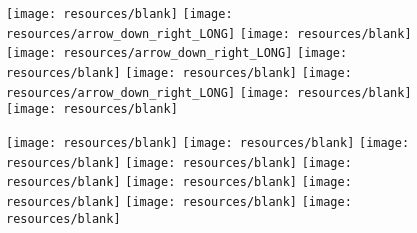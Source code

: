\documentclass[11pt]{article}
\begin{document}
\begin{figure}[htbp]
\begin{minipage}[t]{0.125\textwidth}
  \end{minipage}%
  \begin{minipage}[t]{0.250\textwidth} %
    \centering
    \texttt{[image: resources/blank]}
    \texttt{[image: resources/arrow\_down\_right\_LONG]}
    \texttt{[image: resources/blank]}
    \texttt{[image: resources/arrow\_down\_right\_LONG]}
    \texttt{[image: resources/blank]}
    \texttt{[image: resources/blank]}
    \texttt{[image: resources/arrow\_down\_right\_LONG]}
    \texttt{[image: resources/blank]}
    \texttt{[image: resources/blank]}
  \end{minipage}%
  \begin{minipage}[t]{0.125\textwidth} %
%
  \end{minipage}%
  \begin{minipage}[t]{0.125\textwidth} %
    \centering
    \texttt{[image: resources/blank]}
    \texttt{[image: resources/blank]}
    \texttt{[image: resources/blank]}
    \texttt{[image: resources/blank]}
    \texttt{[image: resources/blank]}
    \texttt{[image: resources/blank]}
    \texttt{[image: resources/blank]}
    \texttt{[image: resources/blank]}
    \texttt{[image: resources/blank]}


\end{minipage}
\end{figure}
\end{document}
